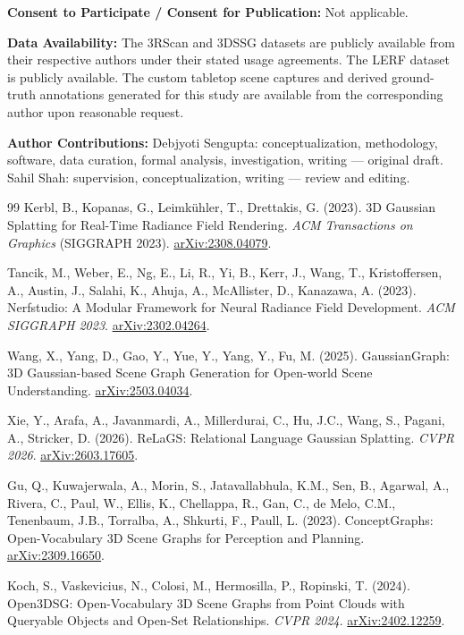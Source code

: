\documentclass[sn-mathphys,Numbered]{sn-jnl}
\begin{document}
\textbf{Consent to Participate / Consent for Publication:} Not applicable.

\textbf{Data Availability:} The 3RScan and 3DSSG datasets are publicly available from their respective authors under their stated usage agreements. The LERF dataset is publicly available. The custom tabletop scene captures and derived ground-truth annotations generated for this study are available from the corresponding author upon reasonable request.

\textbf{Author Contributions:} Debjyoti Sengupta: conceptualization, methodology, software, data curation, formal analysis, investigation, writing --- original draft. Sahil Shah: supervision, conceptualization, writing --- review and editing.

\begin{thebibliography}{99}
 Kerbl, B., Kopanas, G., Leimk\"uhler, T., Drettakis, G. (2023). 3D Gaussian Splatting for Real-Time Radiance Field Rendering. \textit{ACM Transactions on Graphics} (SIGGRAPH 2023). \href{https://arxiv.org/abs/2308.04079}{arXiv:2308.04079}.

 Tancik, M., Weber, E., Ng, E., Li, R., Yi, B., Kerr, J., Wang, T., Kristoffersen, A., Austin, J., Salahi, K., Ahuja, A., McAllister, D., Kanazawa, A. (2023). Nerfstudio: A Modular Framework for Neural Radiance Field Development. \textit{ACM SIGGRAPH 2023}. \href{https://arxiv.org/abs/2302.04264}{arXiv:2302.04264}.

 Wang, X., Yang, D., Gao, Y., Yue, Y., Yang, Y., Fu, M. (2025). GaussianGraph: 3D Gaussian-based Scene Graph Generation for Open-world Scene Understanding. \href{https://arxiv.org/abs/2503.04034}{arXiv:2503.04034}.

 Xie, Y., Arafa, A., Javanmardi, A., Millerdurai, C., Hu, J.C., Wang, S., Pagani, A., Stricker, D. (2026). ReLaGS: Relational Language Gaussian Splatting. \textit{CVPR 2026}. \href{https://arxiv.org/abs/2603.17605}{arXiv:2603.17605}.

 Gu, Q., Kuwajerwala, A., Morin, S., Jatavallabhula, K.M., Sen, B., Agarwal, A., Rivera, C., Paul, W., Ellis, K., Chellappa, R., Gan, C., de Melo, C.M., Tenenbaum, J.B., Torralba, A., Shkurti, F., Paull, L. (2023). ConceptGraphs: Open-Vocabulary 3D Scene Graphs for Perception and Planning. \href{https://arxiv.org/abs/2309.16650}{arXiv:2309.16650}.

 Koch, S., Vaskevicius, N., Colosi, M., Hermosilla, P., Ropinski, T. (2024). Open3DSG: Open-Vocabulary 3D Scene Graphs from Point Clouds with Queryable Objects and Open-Set Relationships. \textit{CVPR 2024}. \href{https://arxiv.org/abs/2402.12259}{arXiv:2402.12259}.


\end{thebibliography}
\end{document}
